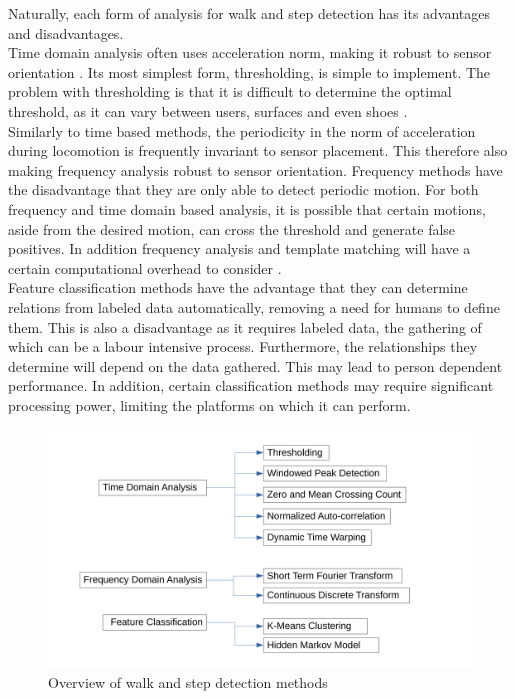 Naturally, each form of analysis for walk and step detection has its advantages and disadvantages.\\
Time domain analysis often uses acceleration norm, making it robust to sensor orientation \cite{Davidson2017}. Its most simplest form, thresholding, is simple to implement. The problem with thresholding is that it is difficult to determine the optimal threshold, as it can vary between users, surfaces and even shoes \cite{Brajdic2013}. \\
Similarly to time based methods, the periodicity in the norm of acceleration during locomotion is frequently invariant to sensor placement. This therefore also making frequency analysis robust to sensor orientation. Frequency methods have the disadvantage that they are only able to detect periodic motion. 
For both frequency and time domain based analysis, it is possible that certain motions, aside from the desired motion, can cross the threshold and generate false positives. In addition frequency analysis and template matching will have a certain computational overhead to consider \cite{Davidson2017, Harle2013}. \\
Feature classification methods have the advantage that they can determine relations from labeled data automatically, removing a need for humans to define them. This is also a disadvantage as it requires labeled data, the gathering of which can be a labour intensive process. Furthermore, the relationships they determine will depend on the data gathered. This may lead to person dependent performance. In addition, certain classification methods may require significant processing power, limiting the platforms on which it can perform.

\begin{figure}[]
	\centering
	\includegraphics[trim=0 15 0 20, clip,width=0.7\linewidth]{images/step_detection_options}
	\caption{Overview of walk and step detection methods}
	\label{fig:step_detection_options}
\end{figure}

